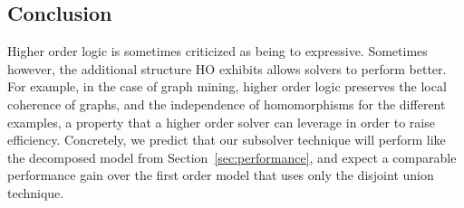 
\subsection{Conclusion}
Higher order logic is sometimes criticized as being to expressive.
Sometimes however, the additional structure HO exhibits allows solvers to perform better.
For example, in the case of graph mining, higher order logic preserves the local coherence of graphs, and the independence of homomorphisms for the different examples, a property that a higher order solver can leverage in order to raise efficiency. 
Concretely, we predict that our subsolver technique will perform like the decomposed model from Section~\ref{sec:performance}, and expect a comparable performance gain over the first order model that uses only the disjoint union technique.




%
%
%
%
